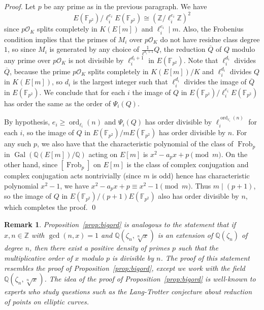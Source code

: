 \documentclass{oupau}
\DeclareMathOperator{\Frob}{Frob}
\DeclareMathOperator{\Gal}{Gal}
\DeclareMathOperator{\ord}{ord}
\newcommand{\isom}{\cong}
\newcommand{\FF}{\mathbb{F}}
\newcommand{\OO}{\mathcal{O}}
\newcommand{\QQ}{\mathbb{Q}}
\newcommand{\ZZ}{\mathbb{Z}}
\newtheorem{remark}[theorem]{Remark}
\begin{document}
\begin{proof}
Let $p$ be any prime as in the previous paragraph.  We have 
$$E(\FF_{p^2})/ \ell_i^{e_i} E(\FF_{p^2}) \isom (\ZZ/\ell_i^{e_i}\ZZ)^2$$ 
since $p\OO_K$ splits completely in $K(E[m])$ and $\ell_i^{e_i}\mid m$.
Also, the Frobenius condition implies that the primes of $M_i$ over
$p\OO_K$ do not have residue class degree $1$, so since
$M_i$ is generated by any choice of $\frac{1}{\ell^{d_i+1}}Q$, the
reduction $\overline{Q}$ of $Q$ modulo any prime over $p\OO_K$ is not
divisible by $\ell_i^{d_i+1}$ in $E(\FF_{p^2})$.  Note that
$\ell_i^{d_i}$ divides $\overline{Q}$, because the prime $p\OO_K$ splits
completely in $K(E[m])/K$ and $\ell_i^{d_i}$ divides $Q$ in $K(E[m])$,
so $d_i$ is the largest integer such that $\ell_i^{d_i}$ divides the
image of $\overline{Q}$ in $E(\FF_{p^2})$.   We
conclude that for each $i$ the image of $Q$ in $E(\FF_{p^2})/
\ell_i^{e_i} E(\FF_{p^2})$ has order the same as the order of
$\Psi_i(Q)$.

By hypothesis, $e_i\geq \ord_{\ell_i}(n)$
and $\Psi_i(Q)$ has order divisible by $\ell_i^{\ord_{\ell_i}(n)}$ for each $i$,
so the image of $Q$ in $E(\FF_{p^2})/ m E(\FF_{p^2})$ has
order divisible by $n$. 
For any such $p$, we also have that the characteristic
polynomial of the class of $\Frob_p$ in $\Gal(\QQ(E[m])/\QQ)$ acting on $E[m]$ is
$x^2 - a_p x + p \pmod{m}$.  On the other hand, since $[\Frob_p]$ on $E[m]$
is the class of complex conjugation and complex conjugation acts nontrivially (since
$m$ is odd) hence
has characteristic polynomial $x^2-1$, we have
$x^2 - a_p x + p \equiv x^2 - 1 \pmod{m}$. 
Thus $m \mid (p+1)$, so the image of $Q$ in 
$E(\FF_{p^2})/ (p+1) E(\FF_{p^2})$ also has order divisible by $n$,
which completes the proof.
\qed\end{proof}


\begin{remark}\label{rmk:bigord}
  Proposition~\ref{prop:bigord} is analogous to the statement that if
  $x,n\in\ZZ$ with $\gcd(n,x)=1$ and $\QQ(\zeta_n, \sqrt[n]{x})$ is an
  extension of $\QQ(\zeta_n)$ of degree $n$, then there exist a
  positive density of primes $p$ such that the multiplicative order of
  $x$ modulo $p$ is divisible by $n$. The proof of this statement
  resembles the proof of Proposition~\ref{prop:bigord}, except we work
  with the field $\QQ(\zeta_n, \sqrt[n]{x})$.  The idea of the proof
  of Proposition~\ref{prop:bigord} is well-known to experts who study
  questions such as the Lang-Trotter conjecture about reduction of
  points on elliptic curves.
\end{remark}
\end{document}
